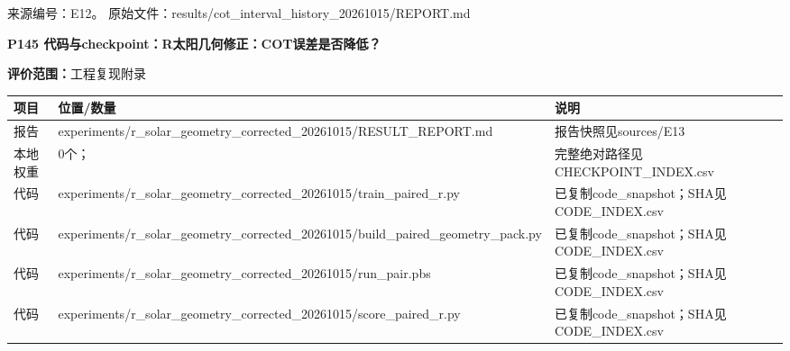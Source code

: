 \documentclass[UTF8,a4paper,landscape,10pt]{ctexart}
\begin{document}
\vfill{\scriptsize\color{muted} 来源编号：E12。 原始文件：results/\allowbreak{}cot\_\allowbreak{}interval\_\allowbreak{}history\_\allowbreak{}20261015/\allowbreak{}REPORT.md}\par
\clearpage
{\large\bfseries\color{ink} P145  代码与checkpoint：R太阳几何修正：COT误差是否降低？}\par
{}\par
{\small\color{muted}\textbf{评价范围：}工程复现附录}\par\vspace{3mm}
\begin{center}\small
\begin{adjustbox}{max totalheight=0.58\textheight,max width=\linewidth}
\begin{minipage}{\linewidth}\begin{tabularx}{\linewidth}{>{\hsize=0.3500\hsize\raggedright\arraybackslash}X>{\hsize=1.9000\hsize\raggedright\arraybackslash}X>{\hsize=0.7500\hsize\raggedright\arraybackslash}X}\toprule
\textbf{项目} & \textbf{位置/\allowbreak{}数量} & \textbf{说明} \\ \midrule
报告 & experiments/\allowbreak{}r\_\allowbreak{}solar\_\allowbreak{}geometry\_\allowbreak{}corrected\_\allowbreak{}20261015/\allowbreak{}RESULT\_\allowbreak{}REPORT.md & 报告快照见sources/\allowbreak{}E13 \\
本地权重 & 0个； & 完整绝对路径见CHECKPOINT\_\allowbreak{}INDEX.csv \\
代码 & experiments/\allowbreak{}r\_\allowbreak{}solar\_\allowbreak{}geometry\_\allowbreak{}corrected\_\allowbreak{}20261015/\allowbreak{}train\_\allowbreak{}paired\_\allowbreak{}r.py & 已复制code\_\allowbreak{}snapshot；SHA见CODE\_\allowbreak{}INDEX.csv \\
代码 & experiments/\allowbreak{}r\_\allowbreak{}solar\_\allowbreak{}geometry\_\allowbreak{}corrected\_\allowbreak{}20261015/\allowbreak{}build\_\allowbreak{}paired\_\allowbreak{}geometry\_\allowbreak{}pack.py & 已复制code\_\allowbreak{}snapshot；SHA见CODE\_\allowbreak{}INDEX.csv \\
代码 & experiments/\allowbreak{}r\_\allowbreak{}solar\_\allowbreak{}geometry\_\allowbreak{}corrected\_\allowbreak{}20261015/\allowbreak{}run\_\allowbreak{}pair.pbs & 已复制code\_\allowbreak{}snapshot；SHA见CODE\_\allowbreak{}INDEX.csv \\
代码 & experiments/\allowbreak{}r\_\allowbreak{}solar\_\allowbreak{}geometry\_\allowbreak{}corrected\_\allowbreak{}20261015/\allowbreak{}score\_\allowbreak{}paired\_\allowbreak{}r.py & 已复制code\_\allowbreak{}snapshot；SHA见CODE\_\allowbreak{}INDEX.csv \\
\bottomrule\end{tabularx}\end{minipage}\end{adjustbox}\end{center}
\end{document}
